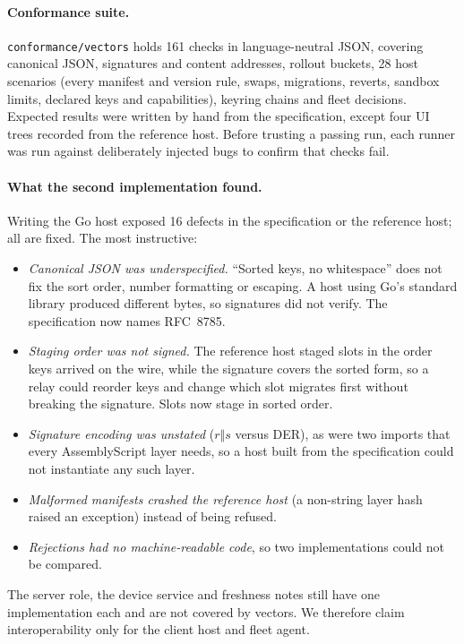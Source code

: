 \documentclass[10pt,twocolumn]{article}
\newcommand{\code}[1]{\texttt{#1}}
\begin{document}
\paragraph{Conformance suite.} \code{conformance/vectors} holds 161 checks in language-neutral
JSON, covering canonical JSON, signatures and content addresses, rollout buckets, 28 host
scenarios (every manifest and version rule, swaps, migrations, reverts, sandbox limits, declared
keys and capabilities), keyring chains and fleet decisions. Expected results were written by hand from the
specification, except four UI trees recorded from the reference host. Before trusting a passing
run, each runner was run against deliberately injected bugs to confirm that checks fail.

\paragraph{What the second implementation found.} Writing the Go host exposed 16 defects in the
specification or the reference host; all are fixed. The most instructive:
\begin{itemize}
\item \emph{Canonical JSON was underspecified.} ``Sorted keys, no whitespace'' does not fix the
sort order, number formatting or escaping. A host using Go's standard library produced different
bytes, so signatures did not verify. The specification now names RFC~8785.
\item \emph{Staging order was not signed.} The reference host staged slots in the order keys
arrived on the wire, while the signature covers the sorted form, so a relay could reorder keys and
change which slot migrates first without breaking the signature. Slots now stage in sorted order.
\item \emph{Signature encoding was unstated} ($r\Vert s$ versus DER), as were two imports that
every AssemblyScript layer needs, so a host built from the specification could not instantiate
any such layer.
\item \emph{Malformed manifests crashed the reference host} (a non-string layer hash raised an
exception) instead of being refused.
\item \emph{Rejections had no machine-readable code}, so two implementations could not be compared.
\end{itemize}

The server role, the device service and freshness notes still have one implementation each and are
not covered by vectors. We therefore claim interoperability only for the client host and fleet
agent.
\end{document}
